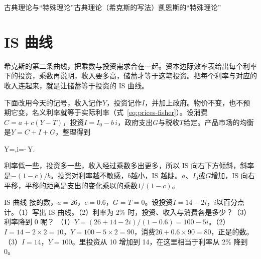 \begin{compare}{古典理论与“特殊理论”}{古典理论（希克斯的写法）}{凯恩斯的“特殊理论”}
\end{compare}

\section{IS 曲线}\label{sec:islm-is}

希克斯的第二条曲线，把乘数与投资需求合在一起。资本边际效率表给出每个利率下的投资，乘数再说明，收入要多高，储蓄才等于这笔投资\cite{hicks1937}。把每个利率与对应的收入连起来，就是让储蓄等于投资的 IS 曲线\cite{hicks1937}。

下面改用今天的记号，收入记作$Y$，投资记作$I$，并加上政府。物价不变，也不预期它变，名义利率就等于实际利率（式~\eqref{eq:prices-fisher}）。设消费$C=a+c(Y-T)$，投资$I=I_0-b\,i$，政府支出$G$与税收$T$给定。产品市场的均衡是$Y=C+I+G$，整理得到
\begin{keyeq}
Y=,\qquad{}\qquad i=-\,Y.\label{eq:islm-is}
\end{keyeq}
利率低一些，投资多一些，收入经过乘数多出更多，所以 IS 向右下方倾斜，斜率是$-(1-c)/b$。投资对利率越不敏感，$b$越小，IS 越陡。$a$、$I_0$或$G$增加，IS 向右平移，平移的距离是支出的变化乘以的乘数$1/(1-c)$。

\begin{example}{IS 曲线}\label{ex:islm-is}
接的数，$a=26$，$c=0.6$，$G=T=0$。设投资$I=14-2i$，$i$以百分点计。（1）写出 IS 曲线。（2）利率为 2\% 时，投资、收入与消费各是多少？（3）利率降到 0 呢？
\solution
（1）$Y=(26+14-2i)/(1-0.6)=100-5i$。（2）$I=14-2\times2=10$，$Y=100-5\times2=90$，消费$26+0.6\times90=80$，正是的数。（3）$I=14$，$Y=100$。里投资从 10 增加到 14，在这里相当于利率从 2\% 降到 0。
\end{example}

